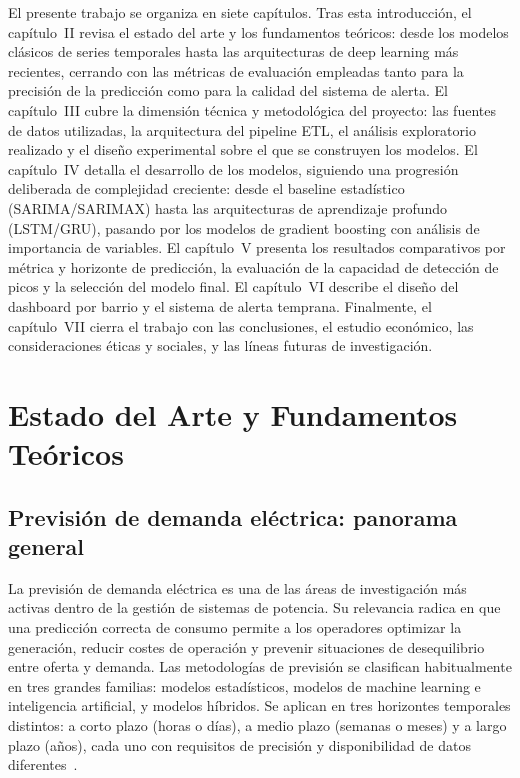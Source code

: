 \documentclass[12pt, a4paper]{article}
\begin{document}
El presente trabajo se organiza en siete capítulos. Tras esta introducción, el capítulo~II revisa el estado del arte y los fundamentos teóricos: desde los modelos clásicos de series temporales hasta las arquitecturas de deep learning más recientes, cerrando con las métricas de evaluación empleadas tanto para la precisión de la predicción como para la calidad del sistema de alerta. El capítulo~III cubre la dimensión técnica y metodológica del proyecto: las fuentes de datos utilizadas, la arquitectura del pipeline ETL, el análisis exploratorio realizado y el diseño experimental sobre el que se construyen los modelos. El capítulo~IV detalla el desarrollo de los modelos, siguiendo una progresión deliberada de complejidad creciente: desde el baseline estadístico (SARIMA/SARIMAX) hasta las arquitecturas de aprendizaje profundo (LSTM/GRU), pasando por los modelos de gradient boosting con análisis de importancia de variables. El capítulo~V presenta los resultados comparativos por métrica y horizonte de predicción, la evaluación de la capacidad de detección de picos y la selección del modelo final. El capítulo~VI describe el diseño del dashboard por barrio y el sistema de alerta temprana. Finalmente, el capítulo~VII cierra el trabajo con las conclusiones, el estudio económico, las consideraciones éticas y sociales, y las líneas futuras de investigación.

\section{Estado del Arte y Fundamentos Teóricos}

\subsection{Previsión de demanda eléctrica: panorama general}

La previsión de demanda eléctrica es una de las áreas de investigación más activas dentro de la gestión de sistemas de potencia. Su relevancia radica en que una predicción correcta de consumo permite a los operadores optimizar la generación, reducir costes de operación y prevenir situaciones de desequilibrio entre oferta y demanda. Las metodologías de previsión se clasifican habitualmente en tres grandes familias: modelos estadísticos, modelos de machine learning e inteligencia artificial, y modelos híbridos. Se aplican en tres horizontes temporales distintos: a corto plazo (horas o días), a medio plazo (semanas o meses) y a largo plazo (años), cada uno con requisitos de precisión y disponibilidad de datos diferentes~\cite{ugbehe2025}.
\end{document}
